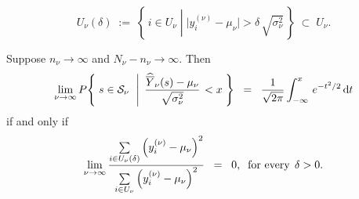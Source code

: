 \begin{theorem}
\begin{itemize}
\begin{equation*}
U_{\nu}(\delta) \;:=\; \left\{\,i \in U_{\nu}\;\left\vert\; \vert y^{(\nu)}_{i} - \mu_{\nu} \vert > \delta \, \sqrt{\sigma_{\nu}^{2}} \right.\,\right\}
\; \subset \; U_{\nu}.
\end{equation*}
\end{itemize}
Suppose $n_{\nu} \longrightarrow \infty$ and $N_{\nu} - n_{\nu} \longrightarrow \infty$.
Then
\begin{equation*}
\lim_{\nu \rightarrow \infty}
P\!\left\{\;s \in \mathcal{S}_{\nu} \;\,\left\vert\;\,\dfrac{\widehat{\overline{Y}}_{\nu}(s) - \mu_{\nu}}{\sqrt{\sigma_{\nu}^{2}}}\right. < x \;\right\}
\;\;=\;\;
\dfrac{1}{\sqrt{2\pi}}
\int_{-\infty}^{x}\,e^{-t^{2}/2}\,\textnormal{d} t
\end{equation*}
if and only if
\begin{equation*}
\lim_{\nu\rightarrow\infty}
\dfrac{
\underset{i \in U_{\nu}(\delta)}{\sum}\left(y^{(\nu)}_{i} - \mu_{\nu}\right)^{2}
}{
\underset{i \in U_{\nu}}{\sum}\left(y^{(\nu)}_{i} - \mu_{\nu}\right)^{2}
}\;\; = \;\; 0,
\;\;\textnormal{for every}\;\, \delta > 0.
\end{equation*}
\end{theorem}

